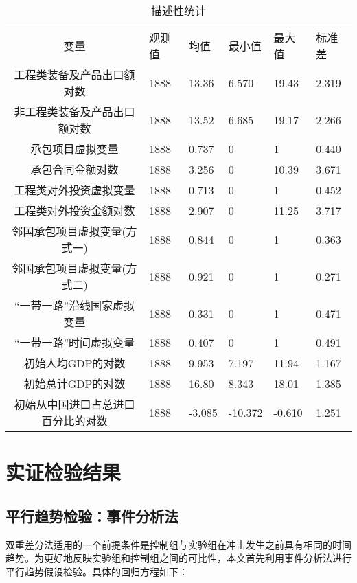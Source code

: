 \documentclass[a4paper,12pt]{article}
\begin{document}
\begin{table} [ht] \footnotesize
	\centering
	\captionsetup{labelformat=default,labelsep=period}
	\caption{描述性统计}\label{table4}
	\begin{tabular}{clllll}
		\toprule		
		变量 & 观测值 & 均值 & 最小值 & 最大值 & 标准差 \\ 
		\cline{1-6} 
		工程类装备及产品出口额对数 & 1888 & 13.36 & 6.570 & 19.43 & 2.319 \\ 
		非工程类装备及产品出口额对数 & 1888 & 13.52 & 6.685 & 19.17 & 2.266 \\ 
		承包项目虚拟变量 & 1888 & 0.737 & 0 & 1 & 0.440 \\ 
		承包合同金额对数 & 1888 & 3.256 & 0 & 10.39 & 3.671 \\ 
		工程类对外投资虚拟变量 & 1888 & 0.713 & 0 & 1 & 0.452 \\ 
		工程类对外投资金额对数 & 1888 & 2.907 & 0 & 11.25 & 3.717 \\ 
		邻国承包项目虚拟变量(方式一) & 1888 & 0.844 & 0 & 1 & 0.363 \\ 
		邻国承包项目虚拟变量(方式二) & 1888 & 0.921 & 0 & 1 & 0.271 \\ 
		“一带一路”沿线国家虚拟变量 & 1888 & 0.331 & 0 & 1 & 0.471 \\ 
		“一带一路”时间虚拟变量 & 1888 & 0.407 & 0 & 1 & 0.491 \\ 
		初始人均GDP的对数 & 1888 & 9.953 & 7.197 & 11.94 & 1.167 \\ 
		初始总计GDP的对数 & 1888 & 16.80 & 8.343 & 18.01 & 1.385 \\ 
		初始从中国进口占总进口百分比的对数 & 1888 & -3.085 & -10.372 & -0.610 & 1.251 \\ 
		\bottomrule
	\end{tabular}
\end{table}
	

\section{实证检验结果}
\subsection{平行趋势检验：事件分析法}

双重差分法适用的一个前提条件是控制组与实验组在冲击发生之前具有相同的时间趋势。为更好地反映实验组和控制组之间的可比性，本文首先利用事件分析法进行平行趋势假设检验。具体的回归方程如下：

\vspace{0.5em}  %
\end{document}
